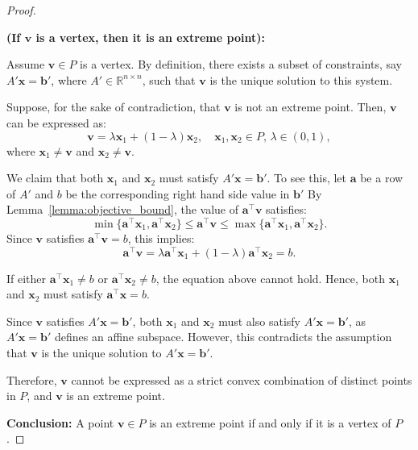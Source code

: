 \begin{proof}
\begin{center}
\end{center}

\textbf{(If \(\mathbf{v}\) is a vertex, then it is an extreme point):}

Assume \( \mathbf{v} \in P \) is a vertex. By definition, there exists a subset of constraints, say \( A'\mathbf{x} = \mathbf{b}' \), where \( A' \in \mathbb{R}^{n \times n} \), such that \( \mathbf{v} \) is the unique solution to this system.

Suppose, for the sake of contradiction, that \( \mathbf{v} \) is not an extreme point. Then, \( \mathbf{v} \) can be expressed as:
\[
\mathbf{v} = \lambda \mathbf{x}_1 + (1 - \lambda) \mathbf{x}_2, \quad \mathbf{x}_1, \mathbf{x}_2 \in P, \, \lambda \in (0, 1),
\]
where \( \mathbf{x}_1 \neq \mathbf{v} \) and \( \mathbf{x}_2 \neq \mathbf{v} \).

We claim that both \( \mathbf{x}_1 \) and \( \mathbf{x}_2 \) must satisfy \( A'\mathbf{x} = \mathbf{b}' \).  To see this, 
let $\mathbf{a}$ be a row of $A'$ and $b$ be the corresponding right hand side value in $\mathbf{b}'$
By Lemma~\ref{lemma:objective_bound}, the value of \( \mathbf{a}^\top \mathbf{v} \) satisfies:
\[
\min\{\mathbf{a}^\top\mathbf{x}_1, \mathbf{a}^\top\mathbf{x}_2\} \leq \mathbf{a}^\top\mathbf{v} \leq \max\{\mathbf{a}^\top\mathbf{x}_1, \mathbf{a}^\top\mathbf{x}_2\}.
\]
Since \( \mathbf{v} \) satisfies \( \mathbf{a}^\top\mathbf{v} = b\), this implies:
\[
\mathbf{a}^\top\mathbf{v} = \lambda \mathbf{a}^\top\mathbf{x}_1 + (1-\lambda) \mathbf{a}^\top\mathbf{x}_2 = b.
\]

If either \( \mathbf{a}^\top\mathbf{x}_1 \neq b \) or \( \mathbf{a}^\top\mathbf{x}_2 \neq b\), the equation above cannot hold. Hence, both \( \mathbf{x}_1 \) and \( \mathbf{x}_2 \) must satisfy \( \mathbf{a}^\top\mathbf{x} = b \).

Since \( \mathbf{v} \) satisfies \( A'\mathbf{x} = \mathbf{b}' \), both \( \mathbf{x}_1 \) and \( \mathbf{x}_2 \) must also satisfy \( A'\mathbf{x} = \mathbf{b}' \), as \( A'\mathbf{x} = \mathbf{b}' \) defines an affine subspace. However, this contradicts the assumption that \( \mathbf{v} \) is the unique solution to \( A'\mathbf{x} = \mathbf{b}' \).

Therefore, \( \mathbf{v} \) cannot be expressed as a strict convex combination of distinct points in \( P \), and \( \mathbf{v} \) is an extreme point.

\textbf{Conclusion:} A point \( \mathbf{v} \in P \) is an extreme point if and only if it is a vertex of \( P \).
\end{proof}


